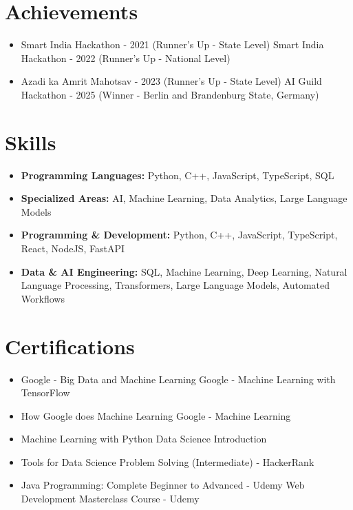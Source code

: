 \documentclass[a4paper,10pt]{article}
\begin{document}
\section*{Achievements}
\begin{itemize}
\item Smart India Hackathon - 2021 (Runner's Up - State Level) \hfill Smart India Hackathon - 2022 (Runner's Up - National Level)
\item Azadi ka Amrit Mahotsav - 2023 (Runner's Up - State Level) \hfill AI Guild Hackathon - 2025 (Winner - Berlin and Brandenburg State, Germany)
\end{itemize}

\section*{Skills}
\begin{itemize}
  \item \textbf{Programming Languages:} Python, C++, JavaScript, TypeScript, SQL
  \item \textbf{Specialized Areas:} AI, Machine Learning, Data Analytics, Large Language Models
  \item \textbf{Programming \& Development:} Python, C++, JavaScript, TypeScript, React, NodeJS, FastAPI
  \item \textbf{Data \& AI Engineering:} SQL, Machine Learning, Deep Learning, Natural Language Processing, Transformers, Large Language Models, Automated Workflows
\end{itemize}

\section*{Certifications}
\begin{itemize}
\item Google - Big Data and Machine Learning \hfill Google - Machine Learning with TensorFlow
\item How Google does Machine Learning \hfill Google - Machine Learning
\item Machine Learning with Python \hfill Data Science Introduction
\item Tools for Data Science \hfill Problem Solving (Intermediate) - HackerRank
\item Java Programming: Complete Beginner to Advanced - Udemy \hfill Web Development Masterclass Course - Udemy
\end{itemize}
\end{document}
